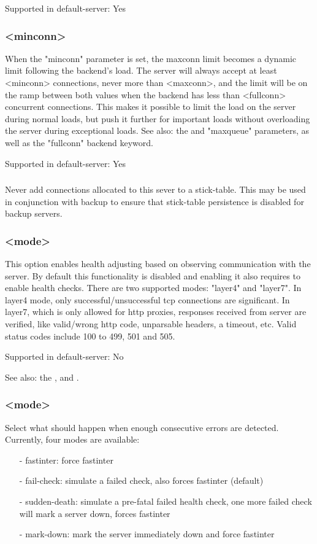   Supported in default-server: Yes

\subsubsection[minconn]{ <minconn>}
  When the "minconn" parameter is set, the maxconn limit becomes a dynamic
  limit following the backend's load. The server will always accept at least
  <minconn> connections, never more than <maxconn>, and the limit will be on
  the ramp between both values when the backend has less than <fullconn>
  concurrent connections. This makes it possible to limit the load on the
  server during normal loads, but push it further for important loads without
  overloading the server during exceptional loads. See also: the 
  and "maxqueue" parameters, as well as the "fullconn" backend keyword.

  Supported in default-server: Yes

\subsubsection[non-stick]{}
  Never add connections allocated to this sever to a stick-table.
  This may be used in conjunction with backup to ensure that
  stick-table persistence is disabled for backup servers.

\subsubsection[observe]{ <mode>}
  This option enables health adjusting based on observing communication with
  the server. By default this functionality is disabled and enabling it also
  requires to enable health checks. There are two supported modes: "layer4" and
  "layer7". In layer4 mode, only successful/unsuccessful tcp connections are
  significant. In layer7, which is only allowed for http proxies, responses
  received from server are verified, like valid/wrong http code, unparsable
  headers, a timeout, etc. Valid status codes include 100 to 499, 501 and 505.

  Supported in default-server: No

  See also: the ,  and .

\subsubsection[on-error]{ <mode>}
  Select what should happen when enough consecutive errors are detected.
  Currently, four modes are available:
  \begin{itemize}
  \item[-] fastinter: force fastinter
  \item[-] fail-check: simulate a failed check, also forces fastinter (default)
  \item[-] sudden-death: simulate a pre-fatal failed health check, one more failed
    check will mark a server down, forces fastinter
  \item[-] mark-down: mark the server immediately down and force fastinter
  \end{itemize}

